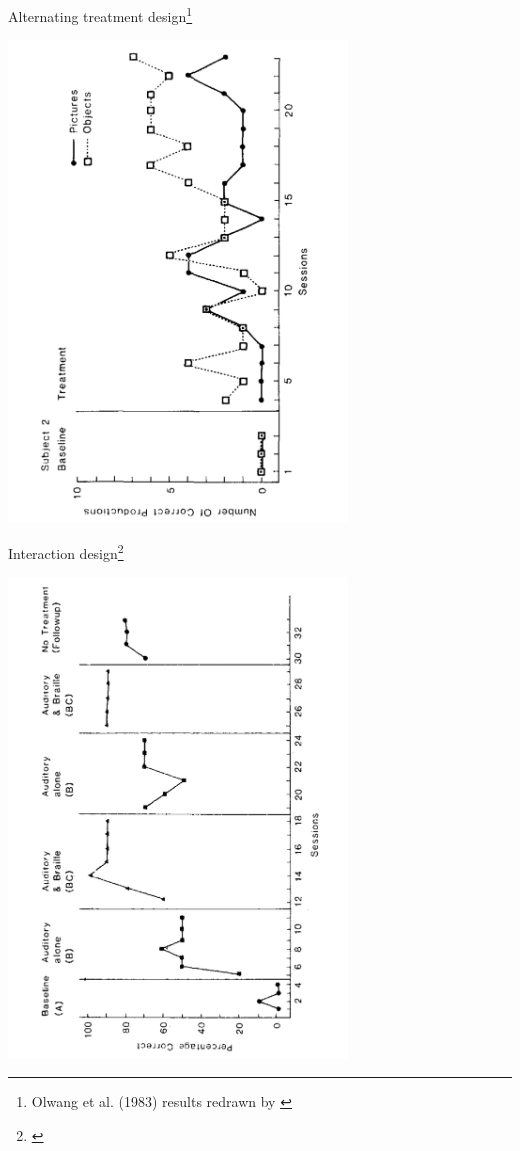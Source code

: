 \documentclass{beamer}
\begin{document}
% 
\begin{frame}{Alternating treatment design\footnote{\tiny{Olwang et al. (1983) results redrawn by \citet[p. 211]{Kearns1986}}}}
	\begin{center}
	\includegraphics[angle=270, width=9cm]{images/kearns1986_p211.pdf}
	\end{center}
\end{frame}

% 
\begin{frame}{Interaction design\footnote{\tiny{\citet[Fig. 3]{Kearns1986}}}}
	\begin{center}
	\includegraphics[angle=270, width=9cm]{images/kearns1986_Fig3.pdf}
	\end{center}
\end{frame}
\end{document}
